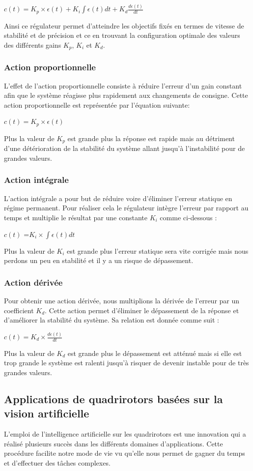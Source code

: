 $ c(t)=K_p\times \epsilon(t) + K_i\int\epsilon(t)dt+K_d\frac{d\epsilon(t)}{dt}$


Ainsi ce régulateur permet d'atteindre les objectifs fixés en termes de vitesse de stabilité et de
précision et ce en trouvant la configuration optimale des valeurs des différents gains $K_p $, $ K_i$ et $ K_d$.
\subsubsection {Action proportionnelle}
L'effet de l’action proportionnelle consiste à réduire l'erreur d’un gain constant afin que le
système réagisse plus rapidement aux changements de consigne. Cette action proportionnelle est
représentée par l'équation suivante:

$ c(t) = K_p\times \epsilon(t) $


Plus la valeur de $K_p$ est grande plus la réponse est rapide mais au détriment d'une détérioration
de la stabilité du système allant jusqu'à l'instabilité pour de grandes valeurs.
\subsubsection  {Action intégrale}
L'action intégrale a pour but de réduire voire d'éliminer l'erreur statique en régime permanent. Pour réaliser cela le régulateur intègre l'erreur par rapport au temps et multiplie le résultat par une
constante $K_i$ comme ci-dessous :

$c(t) $ =$ K_i\times\int \epsilon(t) dt$


Plus la valeur de $K_i$ est grande plus l'erreur statique sera vite corrigée mais nous perdons un peu
en stabilité et il y a un risque de dépassement.

\subsubsection  {Action dérivée}
Pour obtenir une action dérivée, nous multiplions la dérivée de l'erreur par un coefficient $K_d$.
Cette action permet d'éliminer le dépassement de la réponse et d'améliorer la stabilité du système. Sa relation est donnée comme suit :

$ c(t)  = K_d\times\frac{d\epsilon(t)}{dt}$


Plus la valeur de $K_d$ est grande plus le dépassement est atténué mais si elle est trop grande le
système est ralenti jusqu'à risquer de devenir instable pour de très grandes valeurs.
\subsection{Applications de quadrirotors basées sur la vision artificielle}
L'emploi de l'intelligence artificielle sur les quadrirotors est une innovation qui a réalisé plusieurs succès dans les différents domaines d'applications. Cette procédure facilite notre mode de vie vu qu'elle nous permet de gagner du temps et d'effectuer des tâches complexes.

